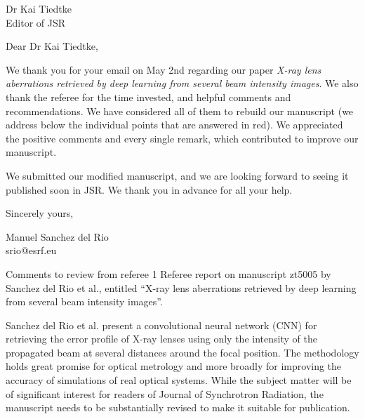 \documentclass[11pt]{letter} %
\begin{document}
 

\begin{letter}{} %

Dr Kai Tiedtke\\
Editor of JSR\\

\opening{Dear Dr Kai Tiedtke,}

We thank you for your email on May 2nd regarding our paper \textit{X-ray lens aberrations retrieved by deep learning from several beam intensity images}. We also thank the referee for the time invested, and helpful comments and recommendations. We have considered all of them to rebuild our manuscript (we address below the individual points that are answered in red). We appreciated the positive comments and every single remark, which contributed to improve our manuscript. 

We submitted our modified manuscript, and we are looking forward to seeing it published soon in JSR. We thank you in advance for all your help.


\closing{Sincerely yours,}



Manuel Sanchez del Rio\\srio@esrf.eu



\newpage


Comments to review from referee 1
Referee report on manuscript zt5005 by Sanchez del Rio et al., entitled “X-ray lens aberrations retrieved by deep learning from several beam intensity images”.

Sanchez del Rio et al. present a convolutional neural network (CNN) for retrieving the error profile of X-ray lenses using only the intensity of the propagated beam at several distances around the focal position. The methodology holds great promise for optical metrology and more broadly for improving the accuracy of simulations of real optical systems. While the subject matter will be of significant interest for readers of Journal of Synchrotron Radiation, the manuscript needs to be substantially revised to make it suitable for publication.


\end{letter}
\end{document}
